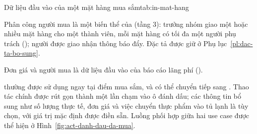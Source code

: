 \begin{fieldtable}{Dữ liệu đầu vào của một mặt hàng mua sắm}{tab:in-mat-hang}
\end{fieldtable}

Phân công người mua là một biến thể của  (tầng 3): trưởng nhóm giao một hoặc nhiều mặt hàng cho một thành viên, mỗi mặt hàng có tối đa một người phụ trách (); người được giao nhận thông báo đẩy. Đặc tả được giữ ở Phụ lục~\ref{pl:dac-ta-bo-sung}.


Đơn giá và người mua là dữ liệu đầu vào của báo cáo lãng phí ().

 thường được sử dụng ngay tại điểm mua sắm, và có thể chuyển tiếp sang . Thao tác chính được rút gọn thành một lần chạm vào ô đánh dấu; các thông tin bổ sung như số lượng thực tế, đơn giá và việc chuyển thực phẩm vào tủ lạnh là tùy chọn, với giá trị mặc định được điền sẵn. Luồng phối hợp giữa hai use case được thể hiện ở Hình~\ref{fig:act-danh-dau-da-mua}.

